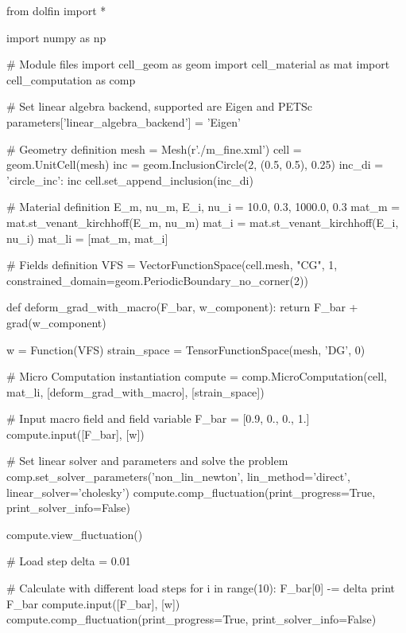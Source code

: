 \documentclass[10pt,a4paper]{scrreprt}
\begin{document}
\begin{python}
from dolfin import *

import numpy as np

# Module files
import cell_geom as geom
import cell_material as mat
import cell_computation as comp

# Set linear algebra backend, supported are Eigen and PETSc
parameters['linear_algebra_backend'] = 'Eigen'

# Geometry definition
mesh = Mesh(r'./m_fine.xml')
cell = geom.UnitCell(mesh)
inc = geom.InclusionCircle(2, (0.5, 0.5), 0.25)
inc_di = {'circle_inc': inc}
cell.set_append_inclusion(inc_di)

# Material definition
E_m, nu_m, E_i, nu_i = 10.0, 0.3, 1000.0, 0.3
mat_m = mat.st_venant_kirchhoff(E_m, nu_m)
mat_i = mat.st_venant_kirchhoff(E_i, nu_i)
mat_li = [mat_m, mat_i]

# Fields definition
VFS = VectorFunctionSpace(cell.mesh, "CG", 1, 
                          constrained_domain=geom.PeriodicBoundary_no_corner(2))

def deform_grad_with_macro(F_bar, w_component):
    return F_bar + grad(w_component)

w = Function(VFS)
strain_space = TensorFunctionSpace(mesh, 'DG', 0)

# Micro Computation instantiation
compute = comp.MicroComputation(cell, mat_li, 
                                [deform_grad_with_macro],
                                [strain_space])

# Input macro field and field variable
F_bar = [0.9, 0., 0., 1.]
compute.input([F_bar], [w])

# Set linear solver and parameters and solve the problem
comp.set_solver_parameters('non_lin_newton', lin_method='direct',
                      linear_solver='cholesky')
compute.comp_fluctuation(print_progress=True, print_solver_info=False)

compute.view_fluctuation()

# Load step
delta = 0.01

# Calculate with different load steps
for i in range(10):
    F_bar[0] -= delta
    print F_bar
    compute.input([F_bar], [w])
    compute.comp_fluctuation(print_progress=True, print_solver_info=False)
\end{python}
\end{document}
